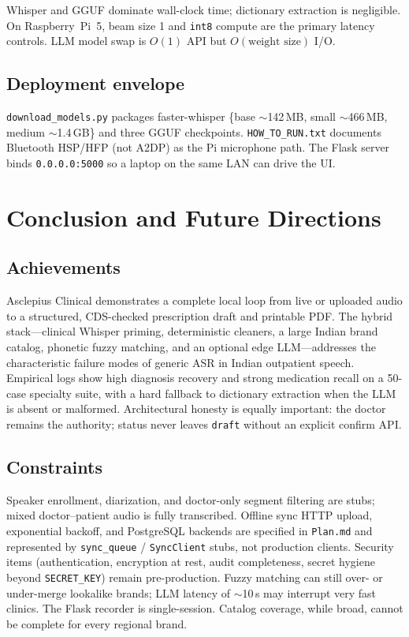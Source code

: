 \documentclass[11pt,a4paper]{article}
\begin{document}
Whisper and GGUF dominate wall-clock time; dictionary extraction is negligible. On Raspberry~Pi~5, beam size 1 and \texttt{int8} compute are the primary latency controls. LLM model swap is $O(1)$ API but $O(\text{weight size})$ I/O.

\subsection{Deployment envelope}
\texttt{download\_models.py} packages faster-whisper \{base $\sim$142\,MB, small $\sim$466\,MB, medium $\sim$1.4\,GB\} and three GGUF checkpoints. \texttt{HOW\_TO\_RUN.txt} documents Bluetooth HSP/HFP (not A2DP) as the Pi microphone path. The Flask server binds \texttt{0.0.0.0:5000} so a laptop on the same LAN can drive the UI.

\section{Conclusion and Future Directions}

\subsection{Achievements}
Asclepius Clinical demonstrates a complete local loop from live or uploaded audio to a structured, CDS-checked prescription draft and printable PDF. The hybrid stack---clinical Whisper priming, deterministic cleaners, a large Indian brand catalog, phonetic fuzzy matching, and an optional edge LLM---addresses the characteristic failure modes of generic ASR in Indian outpatient speech. Empirical logs show high diagnosis recovery and strong medication recall on a 50-case specialty suite, with a hard fallback to dictionary extraction when the LLM is absent or malformed. Architectural honesty is equally important: the doctor remains the authority; status never leaves \texttt{draft} without an explicit confirm API.

\subsection{Constraints}
Speaker enrollment, diarization, and doctor-only segment filtering are stubs; mixed doctor--patient audio is fully transcribed. Offline sync HTTP upload, exponential backoff, and PostgreSQL backends are specified in \texttt{Plan.md} and represented by \texttt{sync\_queue} / \texttt{SyncClient} stubs, not production clients. Security items (authentication, encryption at rest, audit completeness, secret hygiene beyond \texttt{SECRET\_KEY}) remain pre-production. Fuzzy matching can still over- or under-merge lookalike brands; LLM latency of $\sim$10\,s may interrupt very fast clinics. The Flask recorder is single-session. Catalog coverage, while broad, cannot be complete for every regional brand.
\end{document}
